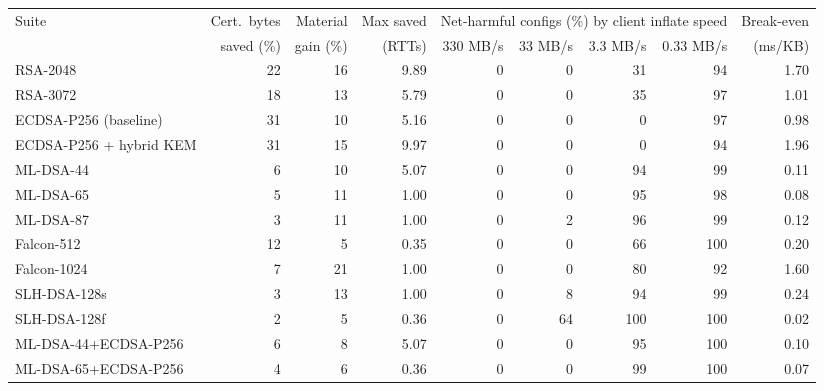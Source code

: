 \begin{tabular}{@{}lrrrrrrrr@{}}
\toprule
Suite & Cert.\ bytes & Material & Max saved & \multicolumn{4}{c}{Net-harmful configs (\%) by client inflate speed} & Break-even \\
\cmidrule(lr){5-8}
 & saved (\%) & gain (\%) & (RTTs) & 330 MB/s & 33 MB/s & 3.3 MB/s & 0.33 MB/s & (ms/KB) \\
\midrule
RSA-2048 & 22 & 16 & 9.89 & 0 & 0 & 31 & 94 & 1.70 \\
RSA-3072 & 18 & 13 & 5.79 & 0 & 0 & 35 & 97 & 1.01 \\
ECDSA-P256 (baseline) & 31 & 10 & 5.16 & 0 & 0 & 0 & 97 & 0.98 \\
ECDSA-P256 + hybrid KEM & 31 & 15 & 9.97 & 0 & 0 & 0 & 94 & 1.96 \\
ML-DSA-44 & 6 & 10 & 5.07 & 0 & 0 & 94 & 99 & 0.11 \\
ML-DSA-65 & 5 & 11 & 1.00 & 0 & 0 & 95 & 98 & 0.08 \\
ML-DSA-87 & 3 & 11 & 1.00 & 0 & 2 & 96 & 99 & 0.12 \\
Falcon-512 & 12 & 5 & 0.35 & 0 & 0 & 66 & 100 & 0.20 \\
Falcon-1024 & 7 & 21 & 1.00 & 0 & 0 & 80 & 92 & 1.60 \\
SLH-DSA-128s & 3 & 13 & 1.00 & 0 & 8 & 94 & 99 & 0.24 \\
SLH-DSA-128f & 2 & 5 & 0.36 & 0 & 64 & 100 & 100 & 0.02 \\
ML-DSA-44+ECDSA-P256 & 6 & 8 & 5.07 & 0 & 0 & 95 & 100 & 0.10 \\
ML-DSA-65+ECDSA-P256 & 4 & 6 & 0.36 & 0 & 0 & 99 & 100 & 0.07 \\
\bottomrule
\end{tabular}

